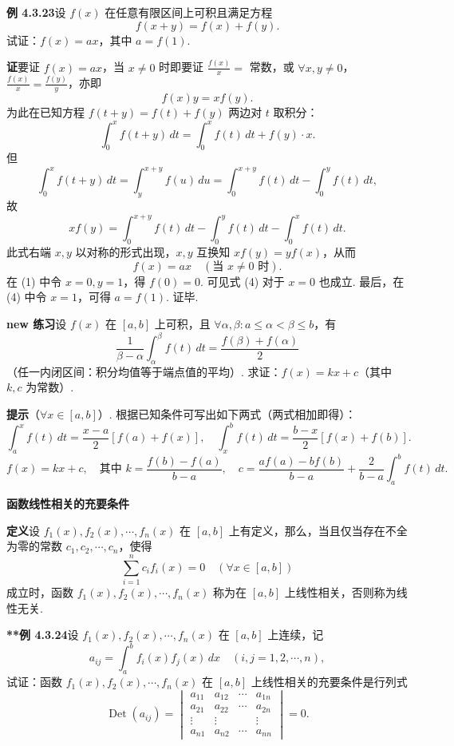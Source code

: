 \documentclass[UTF8,12pt,a4paper,fontset=fandol]{ctexart}
\begin{document}
\noindent\textbf{例 4.3.23}\quad 设 $f(x)$ 在任意有限区间上可积且满足方程
\[
f(x+y)=f(x)+f(y).
\tag{1}
\]
试证：$f(x)=ax$，其中 $a=f(1)$.

\noindent\textbf{证}\quad 要证 $f(x)=ax$，当 $x\ne0$ 时即要证 $\frac{f(x)}x=$ 常数，或 $\forall x,y\ne0$，$\frac{f(x)}x=\frac{f(y)}y$，亦即
\[
f(x)y=xf(y).
\tag{2}
\]
为此在已知方程 $f(t+y)=f(t)+f(y)$ 两边对 $t$ 取积分：
\[
\int_0^x f(t+y)\,dt
=\int_0^x f(t)\,dt+f(y)\cdot x.
\tag{3}
\]
但
\[
\int_0^x f(t+y)\,dt
=\int_y^{x+y}f(u)\,du
=\int_0^{x+y}f(t)\,dt-\int_0^y f(t)\,dt,
\]
故
\[
xf(y)=\int_0^{x+y}f(t)\,dt-\int_0^y f(t)\,dt-\int_0^x f(t)\,dt.
\]
此式右端 $x,y$ 以对称的形式出现，$x,y$ 互换知 $xf(y)=yf(x)$，从而
\[
f(x)=ax\quad(\text{当 }x\ne0\text{ 时}).
\tag{4}
\]
在 (1) 中令 $x=0,y=1$，得 $f(0)=0$. 可见式 (4) 对于 $x=0$ 也成立. 最后，在 (4) 中令 $x=1$，可得 $a=f(1)$. 证毕.

\noindent\textbf{new 练习}\quad 设 $f(x)$ 在 $[a,b]$ 上可积，且 $\forall\alpha,\beta:a\le\alpha<\beta\le b$，有
\[
\frac1{\beta-\alpha}\int_\alpha^\beta f(t)\,dt
=\frac{f(\beta)+f(\alpha)}2
\]
（任一内闭区间：积分均值等于端点值的平均）. 求证：$f(x)=kx+c$（其中 $k,c$ 为常数）.

\noindent\textbf{提示}\quad （$\forall x\in[a,b]$）. 根据已知条件可写出如下两式（两式相加即得）：
\[
\int_a^x f(t)\,dt=\frac{x-a}{2}[f(a)+f(x)],\quad
\int_x^b f(t)\,dt=\frac{b-x}{2}[f(x)+f(b)].
\]
\[
f(x)=kx+c,\quad\text{其中 }k=\frac{f(b)-f(a)}{b-a},\quad
c=\frac{af(a)-bf(b)}{b-a}+\frac{2}{b-a}\int_a^b f(t)\,dt.
\]

\noindent\textbf{函数线性相关的充要条件}

\noindent\textbf{定义}\quad 设 $f_1(x),f_2(x),\cdots,f_n(x)$ 在 $[a,b]$ 上有定义，那么，当且仅当存在不全为零的常数 $c_1,c_2,\cdots,c_n$，使得
\[
\sum_{i=1}^n c_i f_i(x)=0\quad(\forall x\in[a,b])
\]
成立时，函数 $f_1(x),f_2(x),\cdots,f_n(x)$ 称为在 $[a,b]$ 上线性相关，否则称为线性无关.

\noindent\textbf{**例 4.3.24}\quad 设 $f_1(x),f_2(x),\cdots,f_n(x)$ 在 $[a,b]$ 上连续，记
\[
a_{ij}=\int_a^b f_i(x)f_j(x)\,dx\quad(i,j=1,2,\cdots,n),
\]
试证：函数 $f_1(x),f_2(x),\cdots,f_n(x)$ 在 $[a,b]$ 上线性相关的充要条件是行列式
\[
\operatorname{Det}(a_{ij})=
\begin{vmatrix}
a_{11}&a_{12}&\cdots&a_{1n}\\
a_{21}&a_{22}&\cdots&a_{2n}\\
\vdots&\vdots&&\vdots\\
a_{n1}&a_{n2}&\cdots&a_{nn}
\end{vmatrix}=0.
\]
\end{document}
